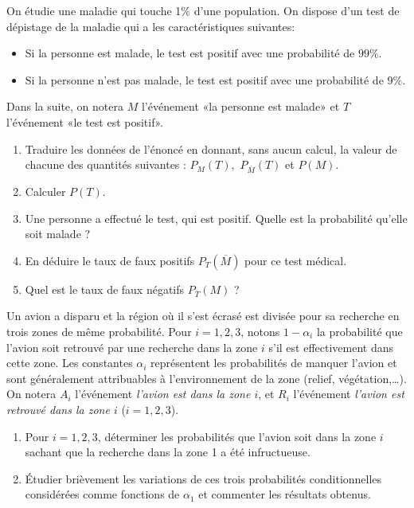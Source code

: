 \documentclass[a4paper,11pt,reqno]{amsart}
\begin{document}
\begin{exo}

  On étudie une maladie qui touche 1$\%$ d'une population. On dispose d'un test  de dépistage de la maladie qui a les caractéristiques suivantes:
  \begin{itemize}
    \item Si la personne est malade, le test est positif avec une probabilité de $99 \%$.
    \item Si la personne n'est pas malade, le test est positif avec une probabilité de $9 \%$.
  \end{itemize}
  Dans la suite, on notera $M$ l'événement «la personne est malade» et $T$ l'événement «le test est positif».

  \begin{enumerate}
    \item Traduire les données de l'énoncé en donnant, sans aucun calcul,  la valeur de chacune des quantités suivantes : $P_M(T),$ $P_{\overline M}(T)$ et $P(M)$.
    \item Calculer $P(T)$.
    \item Une personne a effectué le test, qui est positif. Quelle est la probabilité qu'elle soit malade ?
    \item En déduire le taux de faux positifs $P_T(\overline M)$ pour ce test médical.
    \item Quel est le taux de faux négatifs $P_{\overline T}(M)$ ?
  \end{enumerate}

\end{exo}

\begin{exo}

  Un avion a disparu et la région  où il s'est écrasé est divisée pour sa
  recherche en trois zones de même probabilité. Pour $i=1,2,3$, notons
  $1-\alpha_i$ la probabilité que l'avion soit retrouvé par une recherche
  dans la zone $i$ s'il est effectivement dans cette zone. Les constantes
  $\alpha_i$ représentent les probabilités de manquer l'avion et sont
  généralement attribuables à l'environnement de la zone (relief,
  végétation,\dots). On notera $A_i$ l'événement \emph{l'avion est dans la
  zone $i$}, et $R_i$ l'événement \emph{l'avion est retrouvé dans la zone
  $i$} ($i=1,2,3$).

  \begin{enumerate}
    \item  Pour $i=1,2,3$, déterminer les probabilités que l'avion soit dans la zone $i$ sachant que la recherche dans la zone 1 a été infructueuse.
    \item  Étudier brièvement les variations de ces trois probabilités conditionnelles considérées comme fonctions de $\alpha_1$ et commenter les résultats obtenus.
  \end{enumerate}

\end{exo}
\end{document}
